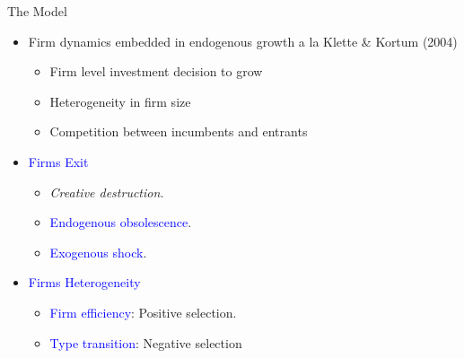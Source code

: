 \documentclass[usenames,dvipsnames,aspectratio=169]{beamer}
\begin{document}
\begin{frame}{The Model}

\begin{itemize}[label=\textcolor{teal}{$\blacktriangleright$}]
\vfill
\item Firm dynamics embedded in endogenous growth a la Klette \& Kortum (2004)
\begin{itemize}[label=\textcolor{teal}{$\star$}]
\item Firm level investment decision to grow 
\item Heterogeneity in firm size
\item Competition between incumbents and entrants
\end{itemize}
\pause
\vfill
\item \textcolor{blue}{Firms Exit}
\begin{itemize}[label=\textcolor{teal}{$\star$}]
\item \textit{Creative destruction.}
\item \textcolor{blue}{Endogenous obsolescence}.
\item \textcolor{blue}{Exogenous shock}.
\end{itemize}
\pause
\vfill
\item \textcolor{blue}{Firms Heterogeneity}
\begin{itemize}[label=\textcolor{teal}{$\star$}]
\item \textcolor{blue}{Firm efficiency}: Positive selection.
\item \textcolor{blue}{Type transition}: Negative selection
\end{itemize}
\vfill
\end{itemize}

\end{frame}
\end{document}
